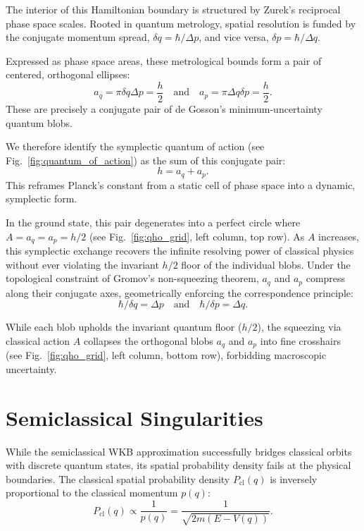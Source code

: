 \documentclass[%
  aps, reprint, prl, amsmath,amssymb
]{revtex4-2}
\begin{document}
The interior of this Hamiltonian boundary is structured by Zurek's reciprocal phase space scales. Rooted in quantum metrology, spatial resolution is funded by the conjugate momentum spread, $\delta q = \hbar / \Delta p$, and vice versa, $\delta p = \hbar / \Delta q$. 

Expressed as phase space areas, these metrological bounds form a pair of centered, orthogonal ellipses:
$$ a_q = \pi \delta q \Delta p = \frac{h}{2} \quad \text{and} \quad a_p = \pi \Delta q \delta p = \frac{h}{2}. $$ 
These are precisely a conjugate pair of de Gosson's minimum-uncertainty quantum blobs.

We therefore identify the symplectic quantum of action (see Fig.~\ref{fig:quantum_of_action}) as the sum of this conjugate pair:
$$h = a_q + a_p.$$
This reframes Planck's constant from a static cell of phase space into a dynamic, symplectic form.

In the ground state, this pair degenerates into a perfect circle where $A = a_q = a_p = h/2$ (see Fig.~\ref{fig:qho_grid}, left column, top row). As $A$ increases, this symplectic exchange recovers the infinite resolving power of classical physics without ever violating the invariant $h/2$ floor of the individual blobs. Under the topological constraint of Gromov's non-squeezing theorem, $a_q$ and $a_p$ compress along their conjugate axes, geometrically enforcing the correspondence principle:
$$\hbar/\delta q = \Delta p \quad \text{and} \quad \hbar/\delta p=\Delta q.$$

While each blob upholds the invariant quantum floor ($h/2$), the squeezing via classical action $A$ collapses the orthogonal blobs $a_q$ and $a_p$ into fine crosshairs (see Fig.~\ref{fig:qho_grid}, left column, bottom row), forbidding macroscopic uncertainty.

\section{Semiclassical Singularities}

While the semiclassical WKB approximation successfully bridges classical orbits with discrete quantum states, its spatial probability density fails at the physical boundaries. The classical spatial probability density $P_{\text{cl}}(q)$ is inversely proportional to the classical momentum $p(q)$:
\begin{equation}
P_{\text{cl}}(q) \propto \frac{1}{p(q)} = \frac{1}{\sqrt{2m(E - V(q))}}.
\end{equation}
\end{document}
